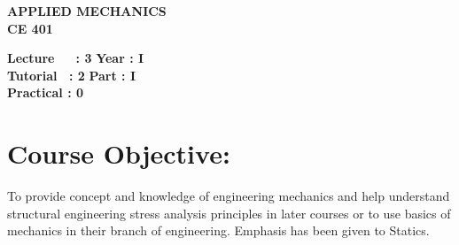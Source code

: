 \begin{center}
    \textbf{\huge{\uppercase{Applied Mechanics}}}
    \\
    \vspace{.5cm}
    \textbf{\large{CE 401}}
\end{center}

\noindent\textbf{Lecture\ \ \ : 3} \hfill \textbf{Year : I } \\
\textbf{Tutorial \ : 2} \hfill \textbf{Part : I } \\
\textbf{Practical : 0}  \\

\par
\noindent 
\section*{Course Objective:}
To provide concept and knowledge of engineering mechanics and help understand structural engineering stress analysis principles in later courses or to use basics of mechanics in their branch of engineering. Emphasis has been given to Statics.

